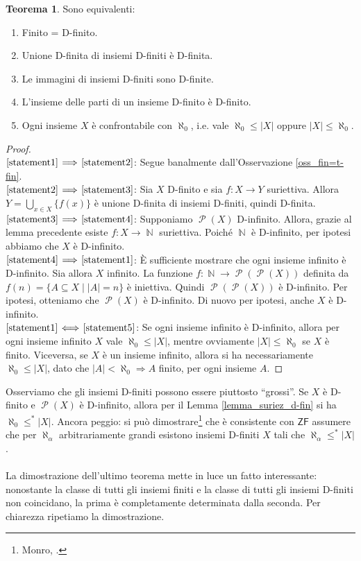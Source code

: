 \documentclass[12pt,a4paper]{report}
\theoremstyle{definition}
\newtheorem{teo}{Teorema}[section]  %
\theoremstyle{num.custom-title}
\DeclareMathOperator{\PP}{\mathcal{P}}
\DeclareMathOperator{\N}{\mathbb{N}}
\DeclareMathOperator{\imp}{\Rightarrow}
\newcommand{\ZF}{\ensuremath{\mathsf{ZF}}\xspace}
\newcommand{\Implies}[2]{$\text{\ref{statement#1}}\!\implies\!\text{\ref{statement#2}}$}%
\newcommand{\punto}[1]{\item \label{statement#1}}
\newenvironment{equivalence}
    {\begin{enumerate}[label=(\arabic*),ref=(\arabic*)]
    }
    { 
	\end{enumerate}
    }
\begin{document}
\begin{teo}\label{caratt_fin=d-fin} Sono equivalenti:
\begin{equivalence}
\punto{1} Finito = D-finito.
\punto{2} Unione D-finita di insiemi D-finiti è D-finita.
\punto{3} Le immagini di insiemi D-finiti sono D-finite.
\punto{4} L'insieme delle parti di un insieme D-finito è D-finito.
\punto{5} Ogni insieme $X$ è confrontabile con $\aleph_0$, i.e. vale $\aleph_0 \leq |X|$ oppure $|X| \leq \aleph_0$.
\end{equivalence}
\begin{proof} \ \\
\Implies{1}{2}: Segue banalmente dall'Osservazione \ref{oss_fin=t-fin}.\\
\Implies{2}{3}: Sia $X$ D-finito e sia $f: X \to Y$ suriettiva. Allora $Y=\bigcup_{x \in X} \{f(x)\}$ è unione D-finita di insiemi D-finiti, quindi D-finita.\\
\Implies{3}{4}: Supponiamo $\PP(X)$ D-infinito. Allora, grazie al lemma precedente esiste $f: X \to \N$ suriettiva. Poiché $\N$ è D-infinito, per ipotesi abbiamo che $X$ è D-infinito.\\
\Implies{4}{1}: È sufficiente mostrare che ogni insieme infinito è D-infinito. Sia allora $X$ infinito. La funzione $f: \N \to \PP(\PP(X))$ definita da $f(n)=\{A \subseteq X \mid |A|=n\}$ è iniettiva. Quindi $\PP(\PP(X))$ è D-infinito. Per ipotesi, otteniamo che $\PP(X)$ è D-infinito. Di nuovo per ipotesi, anche $X$ è D-infinito.\\
$\text{\ref{statement1}}\!\iff\!\text{\ref{statement5}}$: Se ogni insieme infinito è D-infinito, allora per ogni insieme infinito $X$ vale $\aleph_0 \leq |X|$, mentre ovviamente $|X| \leq \aleph_0$ se $X$ è finito. Viceversa, se $X$ è un insieme infinito, allora si ha necessariamente $\aleph_0 \leq |X|$, dato che $|A|<\aleph_0 \imp A$ finito, per ogni insieme $A$.
\end{proof}
\end{teo}

Osserviamo che gli insiemi D-finiti possono essere piuttosto ``grossi''. Se $X$ è D-finito e $\PP(X)$ è D-infinito, allora per il Lemma \ref{lemma_suriez_d-fin} si ha $\aleph_0 \leq^* |X|$. Ancora peggio: si può dimostrare\footnote{Monro, \cite{Mon75:Herrlich}.} che è consistente con \ZF assumere che per $\aleph_\alpha$ arbitrariamente grandi esistono insiemi D-finiti $X$ tali che $\aleph_\alpha \leq^* |X|$.\\
\\
La dimostrazione dell'ultimo teorema mette in luce un fatto interessante: nonostante la classe di tutti gli insiemi finiti e la classe di tutti gli insiemi D-finiti non coincidano, la prima è completamente determinata dalla seconda. Per chiarezza ripetiamo la dimostrazione.
\end{document}
